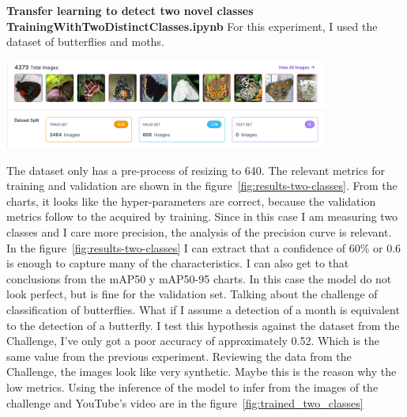 \documentclass{cpsc202}
\begin{document}
    \newpage
    \textbf{Transfer learning to detect two novel classes}
    \Large\textbf{TrainingWithTwoDistinctClasses.ipynb}
    For this experiment, I used the dataset of butterflies and moths.
    \begin{center}
        \includegraphics[width=0.8\textwidth]{trained_two_classes/dataset_two_classes}
    \end{center}
    The dataset only has a pre-process of resizing to 640.
    The relevant metrics for training and validation are shown in the figure~\ref{fig:results-two-classes}.
    From the charts, it looks like the hyper-parameters are correct, because the validation metrics follow to the acquired by training.
    Since in this case I am measuring two classes and I care more precision, the analysis of the precision curve is relevant.
    In the figure~\ref{fig:results-two-classes} I can extract that a confidence of 60\% or 0.6 is enough to capture many of the characteristics.
    I can also get to that conclusions from the mAP50 y mAP50-95 charts.
    In this case the model do not look perfect, but is fine for the validation set.
    Talking about the challenge of classification of butterflies.
    What if I assume a detection of a month is equivalent to the detection of a butterfly.
    I test this hypothesis against the dataset from the Challenge, I've only got a poor accuracy of approximately 0.52.
    Which is the same value from the previous experiment.
    Reviewing the data from the Challenge, the images look like very synthetic.
    Maybe this is the reason why the low metrics.
    Using the inference of the model to infer from the images of the challenge and YouTube's video are in the figure~\ref{fig:trained_two_classes}
\end{document}
